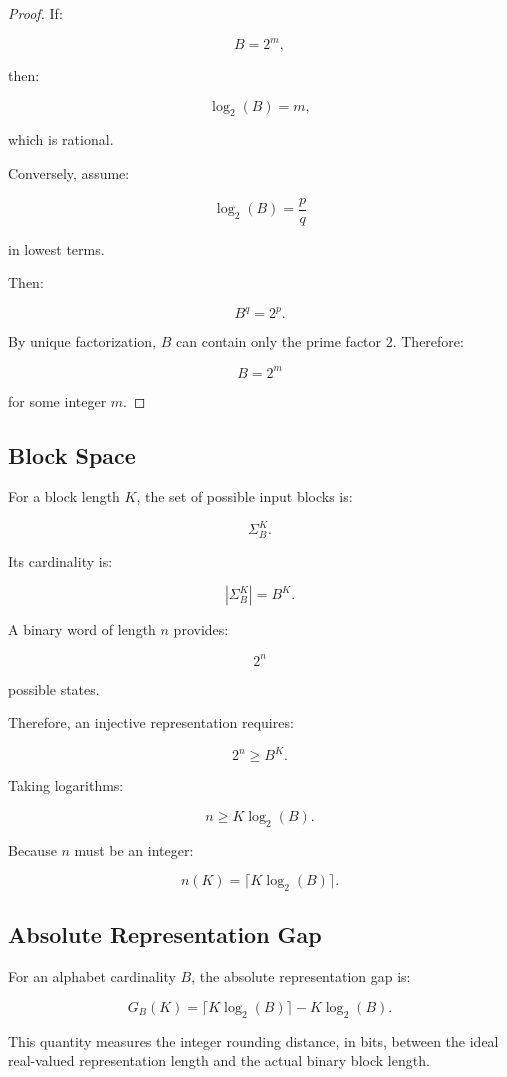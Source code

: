\documentclass[onecolumn]{IEEEtran}
\begin{document}
\begin{proof}

If:

\[
B=2^m,
\]

then:

\[
\log_2(B)=m,
\]

which is rational.

Conversely, assume:

\[
\log_2(B)=\frac{p}{q}
\]

in lowest terms.

Then:

\[
B^q=2^p .
\]

By unique factorization, $B$ can contain only the prime factor $2$.
Therefore:

\[
B=2^m
\]

for some integer $m$.

\end{proof}

\subsection{Block Space}

For a block length $K$, the set of possible input blocks is:

\[
\Sigma_B^K .
\]

Its cardinality is:

\[
|\Sigma_B^K|=B^K .
\]

A binary word of length $n$ provides:

\[
2^n
\]

possible states.

Therefore, an injective representation requires:

\[
2^n\geq B^K .
\]

Taking logarithms:

\[
n\geq K\log_2(B).
\]

Because $n$ must be an integer:

\[
n(K)=\lceil K\log_2(B)\rceil .
\]

\subsection{Absolute Representation Gap}

\begin{definition}

For an alphabet cardinality $B$, the absolute representation gap is:

\[
G_B(K)=
\lceil K\log_2(B)\rceil
-
K\log_2(B).
\]

This quantity measures the integer rounding distance, in bits, between
the ideal real-valued representation length and the actual binary block
length.

\end{definition}
\end{document}
